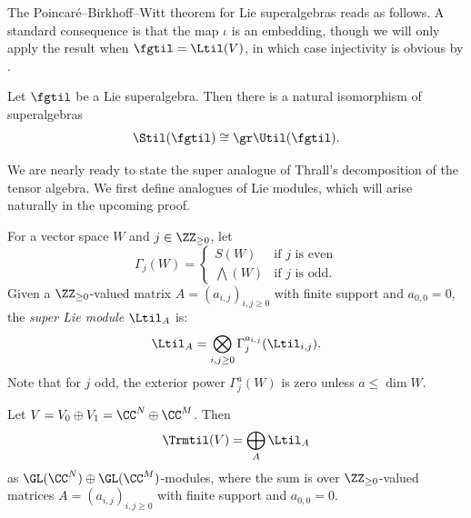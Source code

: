 The Poincar\'e--Birkhoff--Witt theorem for Lie superalgebras reads as follows. A standard consequence is that the map $\iota$ is an embedding, though we will only apply the result when $\fgtil = \Ltil(V)$, in which case injectivity is obvious by .

\begin{thm}
   Let $\fgtil$ be a Lie superalgebra. Then there is a natural isomorphism of superalgebras
     \[ \Stil(\fgtil) \cong \gr \Util(\fgtil). \]
\end{thm}

We are nearly ready to state the super analogue of Thrall's decomposition of the tensor algebra. We first define analogues of Lie modules, which will arise naturally in the upcoming proof.

\begin{defi}\label{def:super-Lie}
    For a vector space $W$ and $j \in \ZZ_{\geq 0}$, let
    \[
    \Gamma_j(W) =
    \begin{cases}
        S(W) & \text{if $j$ is even} \\
        \bigwedge(W) & \text{if $j$ is odd}.
    \end{cases}
    \]
    Given a $\ZZ_{\ge 0}$-valued matrix $A = (a_{i,j})_{i,j \ge 0}$ with finite support and $a_{0,0} = 0$, the \emph{super Lie module} $\Ltil_A$ is:
    \begin{equation}\label{eq:super-higher-lie}
    \Ltil_A = \bigotimes_{i,j \ge 0} \Gamma_j^{a_{i,j}}(\Ltil_{i,j}).
    \end{equation}
    Note that for $j$ odd, the exterior power $\Gamma_j^a(W)$ is zero unless $a \leq \dim W$.
\end{defi}

\begin{thm}\label{thm:super-Thrall}
    Let $V = V_0 \oplus V_1 = \CC^N \oplus \CC^M$. Then
      \[ \Trmtil(V) = \bigoplus_A \Ltil_A \]
    as $\GL(\CC^N) \oplus \GL(\CC^M)$-modules, where the sum is over $\ZZ_{\geq 0}$-valued matrices $A = (a_{i,j})_{i,j \geq 0}$ with finite support and $a_{0,0} = 0$.
\end{thm}

